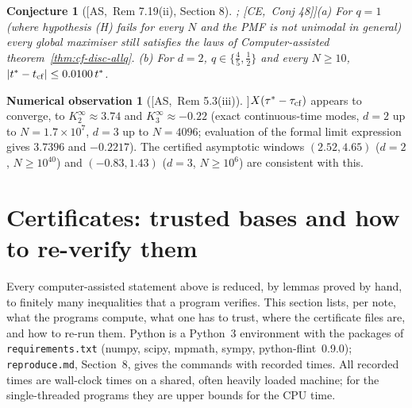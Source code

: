 \documentclass[10pt,a4paper]{article}
\theoremstyle{plain}
\newtheorem{conjecture}[theorem]{Conjecture}
\theoremstyle{definition}
\newtheorem{observation}[theorem]{Numerical observation}
\newcommand{\src}[2]{[\textsf{#1},~#2]}           %
\newcommand{\ASY}{\textsf{AS}}
\newcommand{\CER}{\textsf{CE}}
\begin{document}
\begin{conjecture}[\src{\ASY}{Rem 7.19(ii), Section 8}; \src{\CER}{Conj 48}]\label{conj:modes}
(a) For $q=1$ (where hypothesis (H) fails for every $N$ and the PMF is not unimodal in general) every global maximiser still satisfies the laws of Computer-assisted theorem~\ref{thm:cf-disc-allq}. (b) For $d=2$, $q\in\{\frac45,\frac12\}$ and every $N\ge10$, $|t^*-t_{\rm cf}|\le0.0100\,t^*$.
\end{conjecture}

\begin{observation}[\src{\ASY}{Rem 5.3(iii)}]\label{obs:Kinf}
$X(\tau^*-\tau_{\rm cf})$ appears to converge, to $K_2^\infty\approx3.74$ and $K_3^\infty\approx-0.22$ (exact continuous-time modes, $d=2$ up to $N=1.7\times10^7$, $d=3$ up to $N=4096$; evaluation of the formal limit expression gives $3.7396$ and $-0.2217$). The certified asymptotic windows $(2.52,4.65)$ ($d=2$, $N\ge10^{40}$) and $(-0.83,1.43)$ ($d=3$, $N\ge10^6$) are consistent with this.
\end{observation}

\section{Certificates: trusted bases and how to re-verify them}\label{sec:certs}

Every computer-assisted statement above is reduced, by lemmas proved by hand, to finitely many inequalities that a program verifies. This section lists, per note, what the programs compute, what one has to trust, where the certificate files are, and how to re-run them. Python is a Python~3 environment with the packages of \texttt{requirements.txt} (numpy, scipy, mpmath, sympy, python-flint~0.9.0); \texttt{reproduce.md}, Section~8, gives the commands with recorded times. All recorded times are wall-clock times on a shared, often heavily loaded machine; for the single-threaded programs they are upper bounds for the CPU time.
\end{document}
